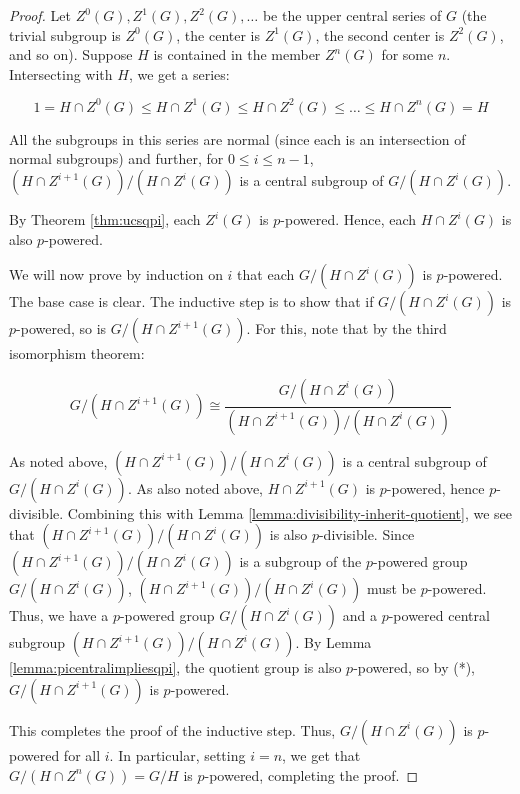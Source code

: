 \begin{proof}
  Let $Z^0(G),Z^1(G),Z^2(G),\dots$ be the upper central series of $G$
  (the trivial subgroup is $Z^0(G)$, the center is $Z^1(G)$, the
  second center is $Z^2(G)$, and so on). Suppose $H$ is contained in
  the member $Z^n(G)$ for some $n$. Intersecting with $H$, we get a
  series:

  $$1 = H \cap Z^0(G) \le H \cap Z^1(G) \le H \cap Z^2(G) \le \dots \le H \cap Z^n(G) = H$$

  All the subgroups in this series are normal (since each is an
  intersection of normal subgroups) and further, for $0
  \le i \le n - 1$, $(H \cap Z^{i+1}(G))/(H \cap Z^i(G))$ is a central
  subgroup of $G/(H \cap Z^i(G))$.

  By Theorem \ref{thm:ucsqpi}, each $Z^i(G)$ is $p$-powered. Hence, each
  $H \cap Z^i(G)$ is also $p$-powered.

  We will now prove by induction on $i$ that each $G/(H \cap Z^i(G))$
  is $p$-powered. The base case is clear. The inductive step is to
  show that if $G/(H \cap Z^i(G))$ is $p$-powered, so is $G/(H \cap
  Z^{i+1}(G))$. For this, note that by the third isomorphism theorem:

  \begin{equation*}
    G/(H \cap Z^{i+1}(G)) \cong \frac{G/(H \cap Z^i(G))}{(H \cap Z^{i+1}(G))/(H \cap Z^i(G))} \tag{*}
  \end{equation*}

  As noted above, $(H \cap Z^{i+1}(G))/(H \cap Z^i(G))$ is a central
  subgroup of $G/(H \cap Z^i(G))$. As also noted above, $H \cap
  Z^{i+1}(G)$ is $p$-powered, hence $p$-divisible. Combining this with
  Lemma \ref{lemma:divisibility-inherit-quotient}, we see that $(H \cap Z^{i+1}(G))/(H
  \cap Z^i(G))$ is also $p$-divisible. Since $(H \cap Z^{i+1}(G))/(H
  \cap Z^i(G))$ is a subgroup of the $p$-powered group $G/(H \cap
  Z^i(G))$, $(H \cap Z^{i+1}(G))/(H \cap Z^i(G))$ must be
  $p$-powered. Thus, we have a $p$-powered group $G/(H \cap Z^i(G))$
  and a $p$-powered central subgroup $(H \cap Z^{i+1}(G))/(H \cap
  Z^i(G))$. By Lemma \ref{lemma:picentralimpliesqpi}, the quotient group is
  also $p$-powered, so by (*), $G/(H \cap Z^{i+1}(G))$ is $p$-powered.

  This completes the proof of the inductive step. Thus, $G/(H \cap
  Z^i(G))$ is $p$-powered for all $i$. In particular, setting $i = n$,
  we get that $G/(H \cap Z^n(G)) = G/H$ is $p$-powered, completing the
  proof.
\end{proof}


